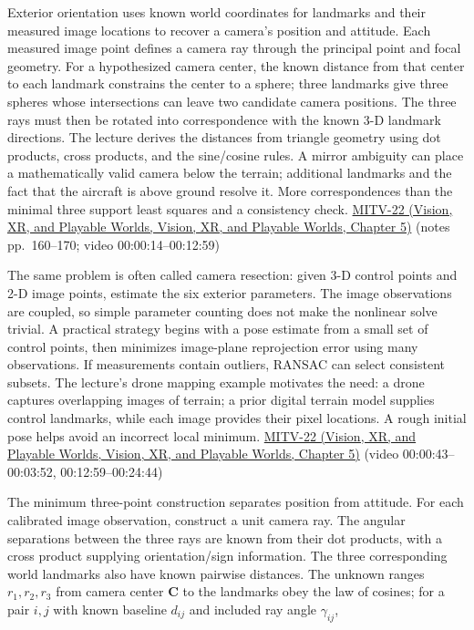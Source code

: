Exterior orientation uses known world coordinates for landmarks and their measured image locations to recover a camera's position and attitude. Each measured image point defines a camera ray through the principal point and focal geometry. For a hypothesized camera center, the known distance from that center to each landmark constrains the center to a sphere; three landmarks give three spheres whose intersections can leave two candidate camera positions. The three rays must then be rotated into correspondence with the known 3-D landmark directions. The lecture derives the distances from triangle geometry using dot products, cross products, and the sine/cosine rules. A mirror ambiguity can place a mathematically valid camera below the terrain; additional landmarks and the fact that the aircraft is above ground resolve it. More correspondences than the minimal three support least squares and a consistency check. \href{../07-Vision-XR-and-Playable-Worlds/main.pdf\#nameddest=04-visual-computing-ii-ch036-mitv-22---exterior-orientation-recovering-position-orientation-bundle-adjustment-object-shape}{MITV-22 (Vision, XR, and Playable Worlds, Vision, XR, and Playable Worlds, Chapter 5)} (notes pp.~160--170; video 00:00:14--00:12:59)

The same problem is often called camera resection: given 3-D control points and 2-D image points, estimate the six exterior parameters. The image observations are coupled, so simple parameter counting does not make the nonlinear solve trivial. A practical strategy begins with a pose estimate from a small set of control points, then minimizes image-plane reprojection error using many observations. If measurements contain outliers, RANSAC can select consistent subsets. The lecture's drone mapping example motivates the need: a drone captures overlapping images of terrain; a prior digital terrain model supplies control landmarks, while each image provides their pixel locations. A rough initial pose helps avoid an incorrect local minimum. \href{../07-Vision-XR-and-Playable-Worlds/main.pdf\#nameddest=04-visual-computing-ii-ch036-mitv-22---exterior-orientation-recovering-position-orientation-bundle-adjustment-object-shape}{MITV-22 (Vision, XR, and Playable Worlds, Vision, XR, and Playable Worlds, Chapter 5)} (video 00:00:43--00:03:52, 00:12:59--00:24:44)

The minimum three-point construction separates position from attitude. For each calibrated image observation, construct a unit camera ray. The angular separations between the three rays are known from their dot products, with a cross product supplying orientation/sign information. The three corresponding world landmarks also have known pairwise distances. The unknown ranges \(r_1,r_2,r_3\) from camera center \(\mathbf C\) to the landmarks obey the law of cosines; for a pair \(i,j\) with known baseline \(d_{ij}\) and included ray angle \(\gamma_{ij}\),

